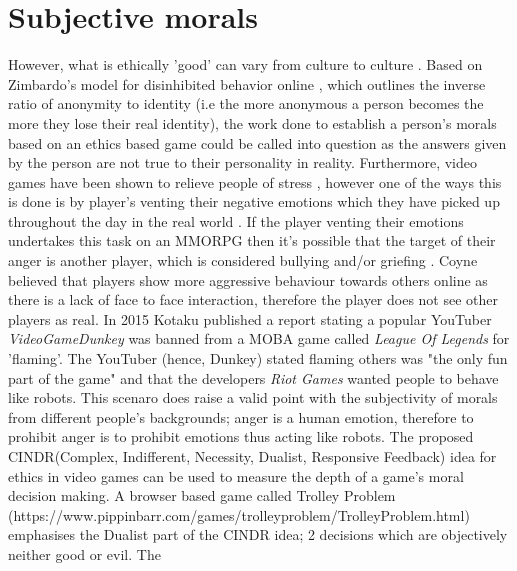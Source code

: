 \documentclass[12pt]{article}
\begin{document}
\section{Subjective morals}
However, what is ethically 'good' can vary from culture to culture \cite{7426669}. Based on Zimbardo's model for disinhibited behavior online \cite{Zim}, which outlines the inverse ratio of anonymity to identity (i.e the more anonymous a person becomes the more they lose their real identity), the work done to establish a person's morals based on an ethics based game could be called into question as the answers given by the person are not true to their personality in reality. Furthermore, video games have been shown to relieve people of stress \cite{7539750}, however one of the ways this is done is by player's venting their negative emotions which they have picked up throughout the day in the real world \cite{6701985}. If the player venting their emotions undertakes this task on an MMORPG then it's possible that the target of their anger is another player, which is considered bullying and/or griefing \cite{coyne2009griefing}. Coyne believed that players show more aggressive behaviour towards others online as there is a lack of face to face interaction, therefore the player does not see other players as real. In 2015 Kotaku \cite{Dunkey} published a report stating a popular YouTuber \textit{VideoGameDunkey} was banned from a MOBA game called \textit{League Of Legends} for 'flaming'. The YouTuber (hence, Dunkey) stated flaming others was "the only fun part of the game" and that the developers \textit{Riot Games} wanted people to behave like robots. This scenaro does raise a valid point with the subjectivity of morals from different people's backgrounds; anger is a human emotion, therefore to prohibit anger is to prohibit emotions thus acting like robots.
The proposed CINDR(Complex, Indifferent, Necessity, Dualist, Responsive Feedback)\cite{7048084} idea for ethics in video games can be used to measure the depth of a game's moral decision making. A browser based game called Trolley Problem (https://www.pippinbarr.com/games/trolleyproblem/TrolleyProblem.html) emphasises the Dualist part of the CINDR idea; 2 decisions which are objectively neither good or evil. The 
\end{document}
